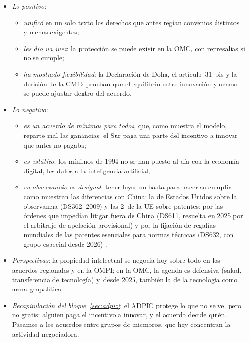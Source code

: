 \documentclass[11pt]{article}
\begin{document}
\begin{itemize}
\item \emph{Lo positivo}:
  \begin{itemize}
  \item \emph{unificó} en un solo texto los derechos que antes regían convenios distintos y menos exigentes;
  \item \emph{les dio un juez}: la protección se puede exigir en la OMC, con represalias si no se cumple;
  \item \emph{ha mostrado flexibilidad}: la Declaración de Doha, el artículo~31~bis y la decisión de la CM12 prueban que el equilibrio entre innovación y acceso se puede ajustar dentro del acuerdo.
  \end{itemize}
\item \emph{Lo negativo}:
  \begin{itemize}
  \item \emph{es un acuerdo de mínimos para todos}, que, como muestra el modelo, reparte mal las ganancias: el Sur paga una parte del incentivo a innovar que antes no pagaba;
  \item \emph{es estático}: los mínimos de 1994 no se han puesto al día con la economía digital, los datos o la inteligencia artificial;
  \item \emph{su observancia es desigual}: tener leyes no basta para hacerlas cumplir, como muestran las diferencias con China: la de Estados Unidos sobre la observancia (DS362, 2009) y las 2~de la UE sobre patentes: por las órdenes que impedían litigar fuera de China (DS611, resuelta en 2025 por el arbitraje de apelación provisional) y por la fijación de regalías mundiales de las patentes esenciales para normas técnicas (DS632, con grupo especial desde 2026)\nocite{OMC2025DS611,OMC2026DS632} .
  \end{itemize}
\item \emph{Perspectivas}: la propiedad intelectual se negocia hoy sobre todo en los acuerdos regionales y en la OMPI; en la OMC, la agenda es defensiva (salud, transferencia de tecnología) y, desde 2025, también la de la tecnología como arma geopolítica.
\item \emph{Recapitulación del bloque~\ref{sec:adpic}}: el ADPIC protege lo que no se ve, pero no gratis: alguien paga el incentivo a innovar, y el acuerdo decide quién. Pasamos a los acuerdos entre grupos de miembros, que hoy concentran la actividad negociadora.
\end{itemize}

\end{document}
